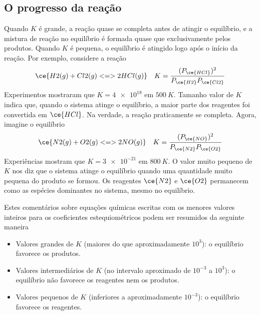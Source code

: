 \subsection{O progresso da reação}

Quando \(K\) é grande, a reação quase se completa antes de atingir o equilíbrio, e a mistura de reação no equilíbrio é formada quase que
exclusivamente pelos produtos. Quando \(K\) é pequena, o equilíbrio é atingido logo após o início da reação. Por exemplo, considere a reação \[
    \ce{ H2(g) + Cl2(g) <=> 2 HCl(g) } 
        \quad K = \dfrac{ (P_{\ce{HCl}})^2 }{ P_{\ce{H2}} P_{\ce{Cl2}} }
\] Experimentos mostraram que \(K = \num{4e18}\) em \(\qty{500}{\unit{K}}\). Tamanho valor de \(K\) indica que, quando o sistema atinge o equilíbrio,
a maior parte dos reagentes foi convertida em \(\ce{HCl}\). Na verdade, a reação praticamente se completa. Agora, imagine o equilíbrio \[
    \ce{ N2(g) + O2(g) <=> 2 NO(g) } 
        \quad K = \dfrac{ (P_{\ce{NO}})^2 }{ P_{\ce{N2}} P_{\ce{O2}} }
\] Experiências mostram que \(K = \num{3e-21}\) em \(\qty{800}{\unit{K}}\). O valor muito pequeno de \(K\) nos diz que o sistema atinge o equilíbrio
quando uma quantidade muito pequena do produto se formou. Os reagentes \(\ce{N2}\) e \(\ce{O2}\) permanecem como as espécies dominantes no sistema,
mesmo no equilíbrio.

Estes comentários sobre equações químicas escritas com os menores valores inteiros para os coeficientes estequiométricos podem ser resumidos da
seguinte maneira

\begin{itemize}
\tightlist
\item
  Valores grandes de \(K\) (maiores do que aproximadamente \(10^3\)): o equilíbrio favorece os produtos.
\item
  Valores intermediários de \(K\) (no intervalo aproximado de \(10^{-3}\) a \(10^3\)): o equilíbrio não favorece os reagentes nem os produtos.
\item
  Valores pequenos de \(K\) (inferiores a aproximadamente \(10^{-3}\)): o equilíbrio favorece os reagentes.
\end{itemize}

